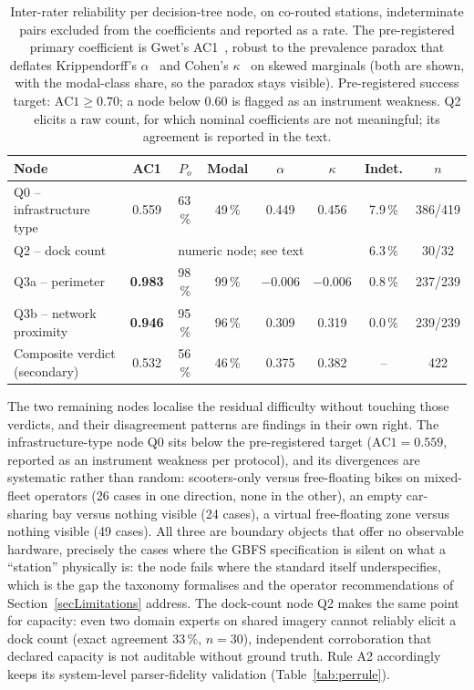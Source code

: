 \documentclass[11pt,a4paper]{article}
\begin{document}
\begin{table}[!htbp]
\centering
\caption{Inter-rater reliability per decision-tree node, on co-routed
stations, indeterminate pairs excluded from the coefficients and reported
as a rate. The pre-registered primary coefficient is Gwet's
AC1~\cite{Gwet2008AC1}, robust to the prevalence paradox that deflates
Krippendorff's $\alpha$~\cite{Krippendorff2018Content} and Cohen's
$\kappa$~\cite{Cohen1960Kappa} on skewed marginals (both are shown, with
the modal-class share, so the paradox stays visible). Pre-registered
success target: $\mathrm{AC1} \ge 0.70$; a node below $0.60$ is flagged as
an instrument weakness. Q2 elicits a raw count, for which nominal
coefficients are not meaningful; its agreement is reported in the text.}
\label{tab:irr}
\small
\begin{tabular}{@{}lccccccc@{}}
\toprule
\textbf{Node} & \textbf{AC1} & \textbf{$P_o$} & \textbf{Modal} &
\textbf{$\alpha$} & \textbf{$\kappa$} & \textbf{Indet.} & \textbf{$n$}\\
\midrule
Q0 -- infrastructure type & 0.559 & 63\,\% & 49\,\% & 0.449 & 0.456 & 7.9\,\% & 386/419\\
Q2 -- dock count          & \multicolumn{5}{c}{numeric node; see text} & 6.3\,\% & 30/32\\
Q3a -- perimeter          & \textbf{0.983} & 98\,\% & 99\,\% & $-0.006$ & $-0.006$ & 0.8\,\% & 237/239\\
Q3b -- network proximity  & \textbf{0.946} & 95\,\% & 96\,\% & 0.309 & 0.319 & 0.0\,\% & 239/239\\
\midrule
Composite verdict (secondary) & 0.532 & 56\,\% & 46\,\% & 0.375 & 0.382 & -- & 422\\
\bottomrule
\end{tabular}
\end{table}

The two remaining nodes localise the residual difficulty without touching
those verdicts, and their disagreement patterns are findings in their own
right. The infrastructure-type node Q0 sits below the pre-registered
target ($\mathrm{AC1} = 0.559$, reported as an instrument weakness per
protocol), and its divergences are systematic rather than random:
scooters-only versus free-floating bikes on mixed-fleet operators (26
cases in one direction, none in the other), an empty car-sharing bay
versus nothing visible (24 cases), a virtual free-floating zone versus
nothing visible (49 cases). All three are boundary objects that offer no
observable hardware, precisely the cases where the GBFS specification is
silent on what a ``station'' physically is: the node fails where the
standard itself underspecifies, which is the gap the taxonomy formalises
and the operator recommendations of Section~\ref{secLimitations} address.
The dock-count node Q2 makes the same point for capacity: even two domain
experts on shared imagery cannot reliably elicit a dock count (exact
agreement $33\,\%$, $n = 30$), independent corroboration that declared
capacity is not auditable without ground truth. Rule A2 accordingly keeps
its system-level parser-fidelity validation (Table~\ref{tab:perrule}).
\end{document}
